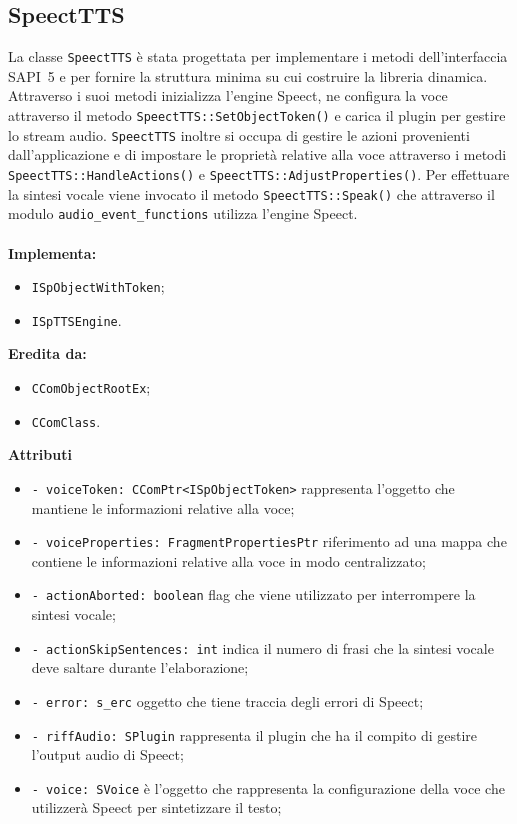 \subsection{SpeectTTS}
La classe \texttt{SpeectTTS} è stata progettata per implementare i metodi dell'interfaccia SAPI~5 e per fornire la struttura minima su cui costruire la libreria dinamica.
Attraverso i suoi metodi inizializza l'engine Speect, ne configura la voce attraverso il metodo \texttt{SpeectTTS::SetObjectToken()} e carica il plugin per gestire lo stream audio.
\texttt{SpeectTTS} inoltre si occupa di gestire le azioni provenienti dall'applicazione e di impostare le proprietà relative alla voce attraverso i metodi \texttt{SpeectTTS::HandleActions()} e \texttt{SpeectTTS::AdjustProperties()}.
Per effettuare la sintesi vocale viene invocato il metodo \texttt{SpeectTTS::Speak()} che attraverso il modulo \texttt{audio\_event\_functions} utilizza l'engine Speect.\\\\
\textbf{Implementa:}
\begin{itemize}
	\item \texttt{ISpObjectWithToken};
	\item \texttt{ISpTTSEngine}.
\end{itemize}
\textbf{Eredita da:}
\begin{itemize}
	\item \texttt{CComObjectRootEx};
	\item \texttt{CComClass}.
\end{itemize}
\textbf{Attributi}
\begin{itemize}
	\item \texttt{- voiceToken: CComPtr<ISpObjectToken>} rappresenta l'oggetto che mantiene le informazioni relative alla voce;
	\item \texttt{- voiceProperties: FragmentPropertiesPtr} riferimento ad una mappa che contiene le informazioni relative alla voce in modo centralizzato;
	\item \texttt{- actionAborted: boolean} flag che viene utilizzato per interrompere la sintesi vocale;
	\item \texttt{- actionSkipSentences: int} indica il numero di frasi che la sintesi vocale deve saltare durante l'elaborazione;
	\item \texttt{- error: s\_erc} oggetto che tiene traccia degli errori di Speect;
	\item \texttt{- riffAudio: SPlugin} rappresenta il plugin che ha il compito di gestire l'output audio di Speect;
	\item \texttt{- voice: SVoice} è l'oggetto che rappresenta la configurazione della voce che utilizzerà Speect per sintetizzare il testo;   
\end{itemize}
